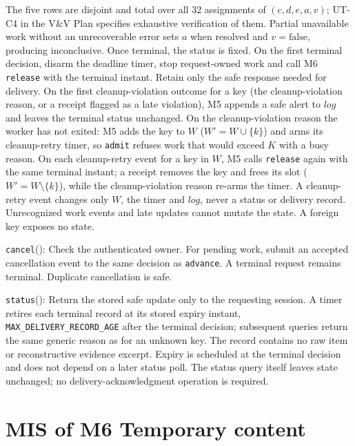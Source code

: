 \documentclass[12pt, titlepage]{article}
\newcommand{\Const}[1]{\texttt{#1}}
\begin{document}
The five rows are disjoint and total over all 32 assignments of $(c,d,e,a,v)$; UT-C4 in the V\&V Plan specifies exhaustive verification of them. Partial unavailable work without an unrecoverable error sets $a$ when resolved and $v=\mathrm{false}$, producing inconclusive. Once terminal, the status is fixed. On the first terminal decision, disarm the deadline timer, stop request-owned work and call M6 \texttt{release} with the terminal instant. Retain only the safe response needed for delivery. On the first cleanup-violation outcome for a key (the cleanup-violation reason, or a receipt flagged as a late violation), M5 appends a safe alert to $\mathit{log}$ and leaves the terminal status unchanged. On the cleanup-violation reason the worker has not exited: M5 adds the key to $W$ ($W'=W\cup\{k\}$) and arms its cleanup-retry timer, so \texttt{admit} refuses work that would exceed $K$ with a busy reason. On each cleanup-retry event for a key in $W$, M5 calls \texttt{release} again with the same terminal instant; a receipt removes the key and frees its slot ($W'=W\setminus\{k\}$), while the cleanup-violation reason re-arms the timer. A cleanup-retry event changes only $W$, the timer and $\mathit{log}$, never a status or delivery record. Unrecognized work events and late updates cannot mutate the state. A foreign key exposes no state.

\medskip\noindent \texttt{cancel}():
Check the authenticated owner. For pending work, submit an accepted cancellation event to the same decision as \texttt{advance}. A terminal request remains terminal. Duplicate cancellation is safe.

\medskip\noindent \texttt{status}():
Return the stored safe update only to the requesting session. A timer retires each terminal record at its stored expiry instant, \Const{MAX\_\allowbreak{}DELIVERY\_\allowbreak{}RECORD\_\allowbreak{}AGE} after the terminal decision; subsequent queries return the same generic reason as for an unknown key. The record contains no raw item or reconstructive evidence excerpt. Expiry is scheduled at the terminal decision and does not depend on a later status poll. The status query itself leaves state unchanged; no delivery-acknowledgment operation is required.

\clearpage
\section{MIS of M6 Temporary content} \label{sec:m6}
\end{document}
